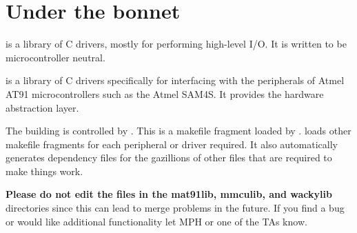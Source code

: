 \section{Under the bonnet}
\label{under-the-bonnet}

 is a library of C drivers, mostly for performing high-level I/O.
It is written to be microcontroller neutral.

 is a library of C drivers specifically for interfacing
with the peripherals of Atmel AT91 microcontrollers such as the Atmel
SAM4S. It provides the hardware abstraction layer.

The building is controlled by . This is a
makefile fragment loaded by .
 loads other makefile fragments for each peripheral or driver required. It also automatically generates
dependency files for the gazillions of other files that are required
to make things work.


\textbf{Please do not edit the files in the mat91lib, mmculib, and
wackylib} directories since this can lead to merge problems in the
future. If you find a bug or would like additional functionality let MPH
or one of the TAs know.
